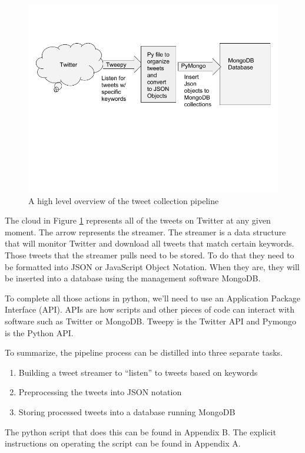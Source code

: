\documentclass[11pt, twoside, reqno]{book}
\begin{document}
\begin{figure}[H]
	\centering
	\includegraphics[scale=0.75]{data_collection}
	\caption{A high level overview of the tweet collection pipeline}
	\label{fig:datacollection}
\end{figure}

The cloud in Figure \ref{fig:datacollection} represents all of the tweets on Twitter at any given moment. The arrow represents the streamer. The streamer is a data structure that will monitor Twitter and download all tweets that match certain keywords. Those tweets that the streamer pulls need to be stored. To do that they need to be formatted into JSON or JavaScript Object Notation. When they are, they will be inserted into a database using the management software MongoDB. 

To complete all those actions in python, we'll need to use an Application Package Interface (API). APIs are how scripts and other pieces of code can interact with software such as Twitter or MongoDB. Tweepy is the Twitter API and Pymongo is the Python API. 
 
To summarize, the pipeline process can be distilled into three separate tasks. 
\begin{enumerate}
	\item Building a tweet streamer to ``listen'' to tweets based on keywords
	\item Preprocessing the tweets into JSON notation
	\item Storing processed tweets into a database running MongoDB 
\end{enumerate}
The python script that does this can be found in Appendix B. The explicit instructions on operating the script can be found in Appendix A. 
\end{document}
